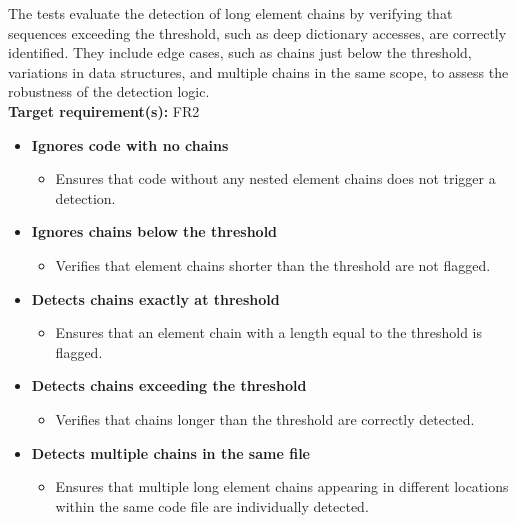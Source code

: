 \documentclass[12pt, titlepage]{article}
\begin{document}
  \noindent The tests evaluate the detection of long element chains
  by verifying that sequences exceeding the threshold, such as deep
  dictionary accesses, are correctly identified. They include edge
  cases, such as chains just below the threshold, variations in data
  structures, and multiple chains in the same scope, to assess the
  robustness of the detection logic.\\

  \noindent\textbf{Target requirement(s):} FR2~\cite{SRS} \\

  \begin{itemize}
    \item \textbf{Ignores code with no chains}
      \begin{itemize}
        \item Ensures that code without any nested element chains
          does not trigger a detection.
      \end{itemize}

    \item \textbf{Ignores chains below the threshold}
      \begin{itemize}
        \item Verifies that element chains shorter than the threshold
          are not flagged.
      \end{itemize}

    \item \textbf{Detects chains exactly at threshold}
      \begin{itemize}
        \item Ensures that an element chain with a length equal to
          the threshold is flagged.
      \end{itemize}

    \item \textbf{Detects chains exceeding the threshold}
      \begin{itemize}
        \item Verifies that chains longer than the threshold are
          correctly detected.
      \end{itemize}

    \item \textbf{Detects multiple chains in the same file}
      \begin{itemize}
        \item Ensures that multiple long element chains appearing in
          different locations within the same code file are
          individually detected.
      \end{itemize}


\end{itemize}
\end{document}

